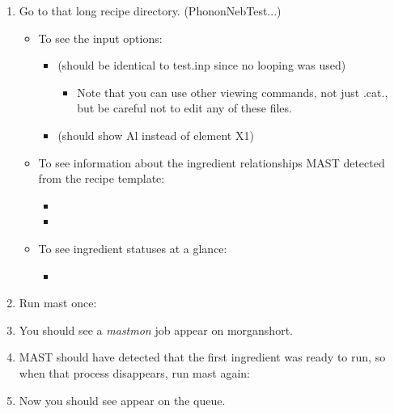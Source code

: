 \documentclass[letterpaper,10pt,english]{sphinxmanual}
\begin{document}
\begin{enumerate}
\item {} 
Go to that long recipe directory. (PhononNebTest...)
\begin{itemize}
\item {} 
To see the input options:
\begin{itemize}
\item {} 
 (should be identical to test.inp since no looping was used)
\begin{itemize}
\item {} 
Note that you can use other viewing commands, not just .cat., but be careful not to edit any of these files.

\end{itemize}

\item {} 
 (should show Al instead of element X1)

\end{itemize}

\item {} 
To see information about the ingredient relationships MAST detected from the recipe template:
\begin{itemize}
\item {} 

\item {} 

\end{itemize}

\item {} 
To see ingredient statuses at a glance:
\begin{itemize}
\item {} 

\end{itemize}

\end{itemize}

\item {} 
Run mast once: 

\item {} 
You should see a \emph{mastmon} job appear on morganshort.

\item {} 
MAST should have detected that the first ingredient was ready to run, so when that process disappears, run mast again: 

\item {} 
Now you should see  appear on the queue.


\end{enumerate}
\end{document}
